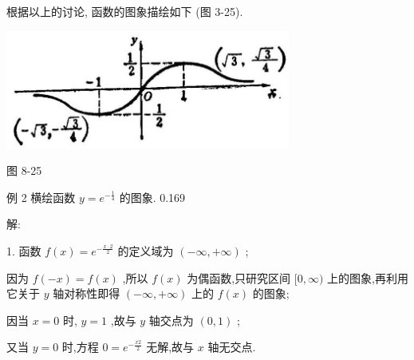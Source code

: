 \documentclass[lang=cn,newtx,10pt,scheme=chinese]{elegantbook}
\begin{document}
\begin{center}
\end{center}

根据以上的讨论, 函数的图象描绘如下 (图 3-25).

\begin{center}
\includegraphics[max width=0.7\textwidth]{images/01912c18-5c3f-733d-b775-749ba9897a9d_172_655401.jpg}
\end{center}

图 8-25

例 2 横绘函数 \(y = {e}^{-\frac{1}{4}}\) 的图象. 0.169

解:

1. 函数 \(f\left( x\right) = {e}^{-\frac{x \cdot 2}{2}}\) 的定义域为 \(\left( {-\infty , + \infty }\right)\) ;

因为 \(f\left( {-x}\right) = f\left( x\right)\) ,所以 \(f\left( x\right)\) 为偶函数,只研究区间 \(\lbrack 0,\infty )\) 上的图象,再利用它关于 \(y\) 轴对称性即得 \(\left( {-\infty , + \infty }\right)\) 上的 \(f\left( x\right)\) 的图象;

因当 \(x = 0\) 时, \(y = 1\) ,故与 \(y\) 轴交点为 \(\left( {0,1}\right)\) ;

又当 \(y = 0\) 时,方程 \(0 = {e}^{-\frac{x2}{2}}\) 无解,故与 \(x\) 轴无交点.
\end{document}
